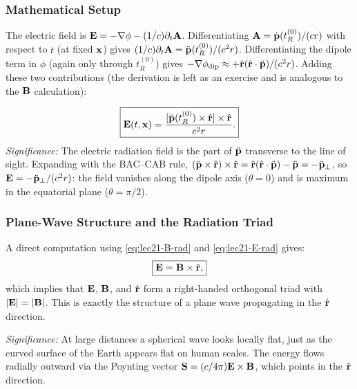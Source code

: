 \subsubsection*{Mathematical Setup}
The electric field is $\mathbf{E}=-\nabla\phi - (1/c)\partial_t\mathbf{A}$.
Differentiating $\mathbf{A} = \dot{\mathbf{p}}(t_R^{(0)})/(cr)$ with respect to $t$ (at
fixed $\mathbf{x}$) gives $(1/c)\partial_t\mathbf{A} = \ddot{\mathbf{p}}(t_R^{(0)})/(c^2r)$.
Differentiating the dipole term in $\phi$ (again only through $t_R^{(0)}$) gives
$-\nabla\phi_{\rm dip} \approx +\hat{\mathbf{r}}(\hat{\mathbf{r}}\cdot\ddot{\mathbf{p}})/(c^2r)$.
Adding these two contributions (the derivation is left as an exercise and is analogous
to the $\mathbf{B}$ calculation):

\begin{equation}\label{eq:lec21-E-rad}
  \boxed{\mathbf{E}(t,\mathbf{x})
  = \frac{[\ddot{\mathbf{p}}(t_R^{(0)})\times\hat{\mathbf{r}}]\times\hat{\mathbf{r}}}{c^2 r}.}
\end{equation}
\textit{Significance:} The electric radiation field is the part of $\ddot{\mathbf{p}}$
transverse to the line of sight. Expanding with the BAC--CAB rule,
$(\ddot{\mathbf{p}}\times\hat{\mathbf{r}})\times\hat{\mathbf{r}}
= \hat{\mathbf{r}}(\hat{\mathbf{r}}\cdot\ddot{\mathbf{p}}) - \ddot{\mathbf{p}}
= -\ddot{\mathbf{p}}_\perp$,
so $\mathbf{E}=-\ddot{\mathbf{p}}_\perp/(c^2r)$: the field vanishes along the dipole axis
($\theta=0$) and is maximum in the equatorial plane ($\theta=\pi/2$).

\subsubsection*{Plane-Wave Structure and the Radiation Triad}
A direct computation using \eqref{eq:lec21-B-rad} and \eqref{eq:lec21-E-rad} gives:
\begin{equation}\label{eq:lec21-E-from-B}
  \boxed{\mathbf{E} = \mathbf{B}\times\hat{\mathbf{r}},}
\end{equation}
which implies that $\mathbf{E}$, $\mathbf{B}$, and $\hat{\mathbf{r}}$ form a right-handed orthogonal
triad with $|\mathbf{E}|=|\mathbf{B}|$. This is exactly the structure of a plane wave
propagating in the $\hat{\mathbf{r}}$ direction.

\textit{Significance:} At large distances a spherical wave looks locally flat, just as
the curved surface of the Earth appears flat on human scales. The energy flows radially
outward via the Poynting vector $\mathbf{S} = (c/4\pi)\mathbf{E}\times\mathbf{B}$,
which points in the $\hat{\mathbf{r}}$ direction.

